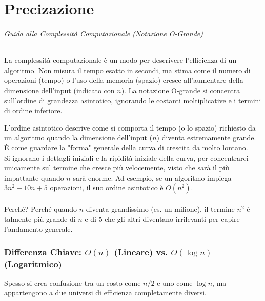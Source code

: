 \part*{Precizazione}
\paragraph{Guida alla Complessità Computazionale (Notazione O-Grande)}
La complessità computazionale è un modo per descrivere l'efficienza di un algoritmo.
Non misura il tempo esatto in secondi, ma stima come il numero di operazioni (tempo) o l'uso della memoria (spazio) cresce all'aumentare della dimensione dell'input (indicato con $n$).
La notazione O-grande si concentra sull'ordine di grandezza asintotico, ignorando le costanti moltiplicative e i termini di ordine inferiore.

\begin{definition}
L'ordine asintotico descrive come si comporta il tempo (o lo spazio) richiesto da un algoritmo quando la dimensione dell'input ($n$) diventa estremamente grande. È come guardare la "forma" generale della curva di crescita da molto lontano.\\

Si ignorano i dettagli iniziali e la ripidità iniziale della curva, per concentrarci unicamente sul termine che cresce più velocemente, visto che sarà il più impattante quando $n$ sarà enorme.
Ad esempio, se un algoritmo impiega $3n^2 + 10n + 5$ operazioni, il suo ordine asintotico è $O(n^2)$.
\\
\\
Perché? Perché quando $n$ diventa grandissimo (es. un milione), il termine $n^2$ è talmente più grande di $n$ e di $5$ che gli altri diventano irrilevanti per capire l'andamento generale.
\end{definition}

\section{Differenza Chiave: $O(n)$ (Lineare) vs. $O(\log n)$ (Logaritmico)}
Spesso si crea confusione tra un costo come $n/2$ e uno come $\log n$, ma appartengono a due universi di efficienza completamente diversi.

